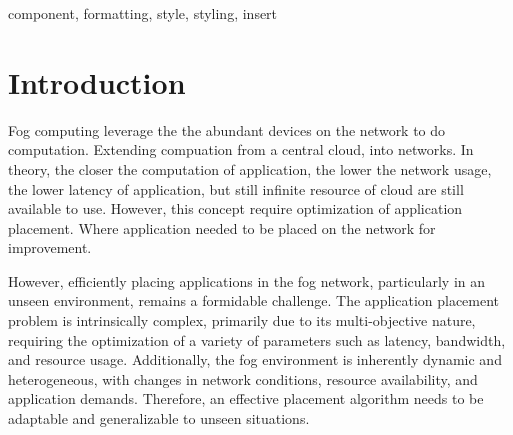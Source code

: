 \documentclass[conference]{IEEEtran}
\begin{document}
\maketitle

\begin{abstract}
This document is a model and instructions for \LaTeX.
This and the IEEEtran.cls file define the components of your paper [title, text, heads, etc.]. *CRITICAL: Do Not Use Symbols, Special Characters, Footnotes, 
or Math in Paper Title or Abstract.

In this paper we discuss the use of multihead attention model to improve performance of fog application placement model. We hypothese that using the multihead attention model, we can increase consideration of every input varible. Resulting a more aware model, that consider not only the applicaiton but also where it is deployed. We compare base model with single layer attention, 16 and 32 head model attention, and heuristic algorithms. 
\end{abstract}

\begin{IEEEkeywords}
component, formatting, style, styling, insert
\end{IEEEkeywords}

\section{Introduction}
Fog computing leverage the the abundant devices on the network to do computation. Extending compuation from a central cloud, into networks. In theory, the closer the computation of application, the lower the network usage, the lower latency of application, but still infinite resource of cloud are still available to use. However, this concept require optimization of application placement. Where application needed to be placed on the network for improvement.


However, efficiently placing applications in the fog network, particularly in an unseen environment, remains a formidable challenge. The application placement problem is intrinsically complex, primarily due to its multi-objective nature, requiring the optimization of a variety of parameters such as latency, bandwidth, and resource usage. Additionally, the fog environment is inherently dynamic and heterogeneous, with changes in network conditions, resource availability, and application demands. Therefore, an effective placement algorithm needs to be adaptable and generalizable to unseen situations.
\end{document}
